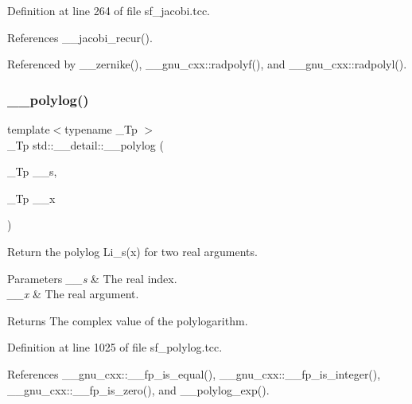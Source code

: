 Definition at line 264 of file sf\+\_\+jacobi.\+tcc.



References \+\_\+\+\_\+jacobi\+\_\+recur().



Referenced by \+\_\+\+\_\+zernike(), \+\_\+\+\_\+gnu\+\_\+cxx\+::radpolyf(), and \+\_\+\+\_\+gnu\+\_\+cxx\+::radpolyl().

\mbox{\label{namespacestd_1_1____detail_a17fb8cea11706f319aaea277188a29c8}} 
\subsubsection{\texorpdfstring{\+\_\+\+\_\+polylog()}{\_\_polylog()}\hspace{0.1cm}{\footnotesize\ttfamily [1/2]}}
{\footnotesize\ttfamily template$<$typename \+\_\+\+Tp $>$ \\
\+\_\+\+Tp std\+::\+\_\+\+\_\+detail\+::\+\_\+\+\_\+polylog (\begin{DoxyParamCaption}\item[{\+\_\+\+Tp}]{\+\_\+\+\_\+s,  }\item[{\+\_\+\+Tp}]{\+\_\+\+\_\+x }\end{DoxyParamCaption})}

Return the polylog Li\+\_\+s(x) for two real arguments.


\begin{DoxyParams}{Parameters}
{\em \+\_\+\+\_\+s} & The real index. \\
\hline
{\em \+\_\+\+\_\+x} & The real argument. \\
\hline
\end{DoxyParams}
\begin{DoxyReturn}{Returns}
The complex value of the polylogarithm. 
\end{DoxyReturn}


Definition at line 1025 of file sf\+\_\+polylog.\+tcc.



References \+\_\+\+\_\+gnu\+\_\+cxx\+::\+\_\+\+\_\+fp\+\_\+is\+\_\+equal(), \+\_\+\+\_\+gnu\+\_\+cxx\+::\+\_\+\+\_\+fp\+\_\+is\+\_\+integer(), \+\_\+\+\_\+gnu\+\_\+cxx\+::\+\_\+\+\_\+fp\+\_\+is\+\_\+zero(), and \+\_\+\+\_\+polylog\+\_\+exp().



